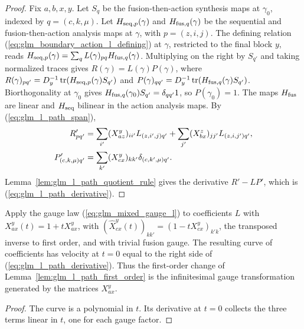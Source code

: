 \begin{proof}
    \leanok
    Fix $a,b,x,y$. Let $S_q$ be the fusion-then-action synthesis maps at
    $\gamma_0$, indexed by $q=(c,k,\mu)$. Let $H_{{\rm seq},p}(\gamma)$ and
    $H_{{\rm fus},q}(\gamma)$ be the sequential and fusion-then-action
    analysis maps at $\gamma$, with $p=(z,i,j)$. The defining relation
    (\ref{eq:glm_boundary_action_l_defining}) at $\gamma$, restricted to the
    final block $y$, reads
    $H_{{\rm seq},p}(\gamma)=\sum_qL(\gamma)_{pq}H_{{\rm fus},q}(\gamma)$.
    Multiplying on the right by $S_{q'}$ and taking normalized traces
    gives $R(\gamma)=L(\gamma)P(\gamma)$, where
    $R(\gamma)_{pq'}=D_y^{-1}\operatorname{tr}(H_{{\rm seq},p}(\gamma)S_{q'})$
    and
    $P(\gamma)_{qq'}=D_y^{-1}\operatorname{tr}(H_{{\rm fus},q}(\gamma)S_{q'})$.
    Biorthogonality at $\gamma_0$ gives
    $H_{{\rm fus},q}(\gamma_0)S_{q'}=\delta_{qq'}1$, so $P(\gamma_0)=1$.
    The maps $H_{\rm fus}$ are linear and $H_{\rm seq}$ bilinear in the
    action analysis maps. By (\ref{eq:glm_l_path_span}),
    \begin{align}
        R'_{pq'}         & =\sum_{i'}(X_{az}^y)_{ii'}L_{(z,i',j)q'}
        +\sum_{j'}(X_{bx}^z)_{jj'}L_{(z,i,j')q'},
        \notag                                                              \\
        P'_{(c,k,\mu)q'} & =\sum_{k'}(X_{cx}^y)_{kk'}\delta_{(c,k',\mu)q'}.
        \notag
    \end{align}
    Lemma~\ref{lem:glm_l_path_quotient_rule} gives the derivative
    $R'-LP'$, which is (\ref{eq:glm_l_path_derivative}).
\end{proof}

\begin{lemma}
    \leanok
    \label{lem:glm_l_path_gauge_tangent}
    Apply the gauge law (\ref{eq:glm_mixed_gauge_l}) to coefficients $L$
    with $X_{ax}^y(t)=1+tX_{ax}^y$, with
    $(\widehat X_{cx}^y(t))_{kk'}=(1-tX_{cx}^y)_{k'k}$, the transposed
    inverse to first order, and with trivial fusion gauge. The resulting
    curve of coefficients has velocity at $t=0$ equal to the right side of
    (\ref{eq:glm_l_path_derivative}). Thus the first-order change of
    Lemma~\ref{lem:glm_l_path_first_order} is the infinitesimal gauge
    transformation generated by the matrices $X_{ax}^y$.
\end{lemma}
\begin{proof}
    \leanok
    The curve is a polynomial in $t$. Its derivative at $t=0$ collects the
    three terms linear in $t$, one for each gauge factor.
\end{proof}

